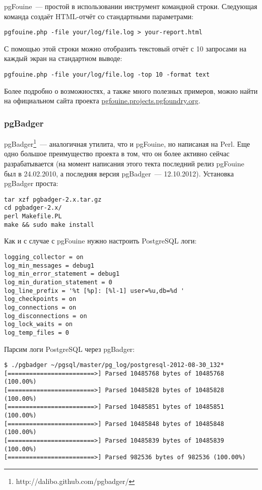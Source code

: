 pgFouine~--- простой в использовании инструмент командной строки. Следующая команда создаёт 
HTML-отчёт со стандартными параметрами:
\begin{lstlisting}[label=lst:sql_performance7,caption=pgFouine]
pgfouine.php -file your/log/file.log > your-report.html
\end{lstlisting}

С помощью этой строки можно отобразить текстовый отчёт с 10 запросами на каждый экран на стандартном выводе:
\begin{lstlisting}[label=lst:sql_performance8,caption=pgFouine]
pgfouine.php -file your/log/file.log -top 10 -format text
\end{lstlisting}

Более подробно о возможностях, а также много полезных примеров, можно найти на официальном сайта проекта \href{http://pgfouine.projects.pgfoundry.org/}{pgfouine.projects.pgfoundry.org}.

\subsubsection{pgBadger}
pgBadger\footnote{http://dalibo.github.com/pgbadger/}~--- аналогичная утилита, что и pgFouine, но написаная на Perl. Еще одно большое преимущество проекта в том, что он более активно сейчас разрабатывается (на момент написания этого текта последний релиз pgFouine был в 24.02.2010, а последняя версия pgBadger~--- 12.10.2012). Установка pgBadger проста:

\begin{lstlisting}[label=lst:sql_performance9,caption=Установка pgBadger]
tar xzf pgbadger-2.x.tar.gz
cd pgbadger-2.x/
perl Makefile.PL
make && sudo make install
\end{lstlisting}

Как и с случае с pgFouine нужно настроить PostgreSQL логи:

\begin{lstlisting}[label=lst:sql_performance10,caption=Настройка логов PostgreSQL]
logging_collector = on
log_min_messages = debug1
log_min_error_statement = debug1
log_min_duration_statement = 0
log_line_prefix = '%t [%p]: [%l-1] user=%u,db=%d '
log_checkpoints = on
log_connections = on
log_disconnections = on
log_lock_waits = on
log_temp_files = 0
\end{lstlisting}

Парсим логи PostgreSQL через pgBadger:

\begin{lstlisting}[label=lst:sql_performance11,caption=Запуск pgBadger]
$ ./pgbadger ~/pgsql/master/pg_log/postgresql-2012-08-30_132*
[========================>] Parsed 10485768 bytes of 10485768 (100.00%)
[========================>] Parsed 10485828 bytes of 10485828 (100.00%)
[========================>] Parsed 10485851 bytes of 10485851 (100.00%)
[========================>] Parsed 10485848 bytes of 10485848 (100.00%)
[========================>] Parsed 10485839 bytes of 10485839 (100.00%)
[========================>] Parsed 982536 bytes of 982536 (100.00%)
\end{lstlisting}


